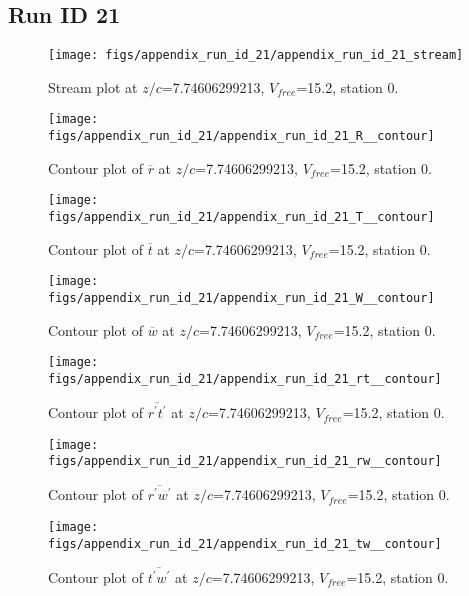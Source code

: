 \subsection{Run ID 21}
\begin{figure}[H]
\centering
\texttt{[image: figs/appendix\_run\_id\_21/appendix\_run\_id\_21\_stream]}
\caption{Stream plot at $z/c$=7.74606299213, $V_{free}$=15.2, station 0.}
\label{fig:appendix_run_id_21_stream}
\end{figure}


\begin{figure}[H]
\centering
\texttt{[image: figs/appendix\_run\_id\_21/appendix\_run\_id\_21\_R\_\_contour]}
\caption{Contour plot of $\overline{r}$ at $z/c$=7.74606299213, $V_{free}$=15.2, station 0.}
\label{fig:appendix_run_id_21_R__contour}
\end{figure}


\begin{figure}[H]
\centering
\texttt{[image: figs/appendix\_run\_id\_21/appendix\_run\_id\_21\_T\_\_contour]}
\caption{Contour plot of $\overline{t}$ at $z/c$=7.74606299213, $V_{free}$=15.2, station 0.}
\label{fig:appendix_run_id_21_T__contour}
\end{figure}


\begin{figure}[H]
\centering
\texttt{[image: figs/appendix\_run\_id\_21/appendix\_run\_id\_21\_W\_\_contour]}
\caption{Contour plot of $\overline{w}$ at $z/c$=7.74606299213, $V_{free}$=15.2, station 0.}
\label{fig:appendix_run_id_21_W__contour}
\end{figure}


\begin{figure}[H]
\centering
\texttt{[image: figs/appendix\_run\_id\_21/appendix\_run\_id\_21\_rt\_\_contour]}
\caption{Contour plot of $\overline{r^\prime t^\prime}$ at $z/c$=7.74606299213, $V_{free}$=15.2, station 0.}
\label{fig:appendix_run_id_21_rt__contour}
\end{figure}


\begin{figure}[H]
\centering
\texttt{[image: figs/appendix\_run\_id\_21/appendix\_run\_id\_21\_rw\_\_contour]}
\caption{Contour plot of $\overline{r^\prime w^\prime}$ at $z/c$=7.74606299213, $V_{free}$=15.2, station 0.}
\label{fig:appendix_run_id_21_rw__contour}
\end{figure}


\begin{figure}[H]
\centering
\texttt{[image: figs/appendix\_run\_id\_21/appendix\_run\_id\_21\_tw\_\_contour]}
\caption{Contour plot of $\overline{t^\prime w^\prime}$ at $z/c$=7.74606299213, $V_{free}$=15.2, station 0.}
\label{fig:appendix_run_id_21_tw__contour}
\end{figure}


